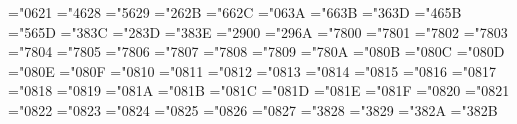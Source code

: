 \mathchardef\bfexcl="0621
\mathchardef\bflparen="4628
\mathchardef\bfrparen="5629
\mathchardef\bfplus="262B
\mathchardef\bfcomma="662C
\mathchardef\bfcolon="063A
\mathchardef\bfsemicolon="663B
\mathchardef\bfequal="363D
\mathchardef\bflbraket="465B
\mathchardef\bfrbraket="565D
\mathchardef\bflt="383C
\mathchardef\bfslash="283D
\mathchardef\bfgt="383E
\mathchardef\bfminus="2900
\mathchardef\bfvert="296A
\mathchardef\bfGamma="7800
\mathchardef\bfDelta="7801
\mathchardef\bfTheta="7802
\mathchardef\bfLambda="7803
\mathchardef\bfXi="7804
\mathchardef\bfPi="7805
\mathchardef\bfSigma="7806
\mathchardef\bfUpsilon="7807
\mathchardef\bfPhi="7808
\mathchardef\bfPsi="7809
\mathchardef\bfOmega="780A
\mathchardef\bfalpha="080B
\mathchardef\bfbeta="080C
\mathchardef\bfgamma="080D
\mathchardef\bfdelta="080E
\mathchardef\bfepsilon="080F
\mathchardef\bfzeta="0810
\mathchardef\bfeta="0811
\mathchardef\bftheta="0812
\mathchardef\bfiota="0813
\mathchardef\bfkappa="0814
\mathchardef\bflambda="0815
\mathchardef\bfmu="0816
\mathchardef\bfnu="0817
\mathchardef\bfxi="0818
\mathchardef\bfpi="0819
\mathchardef\bfrho="081A
\mathchardef\bfsigma="081B
\mathchardef\bftau="081C
\mathchardef\bfupsilon="081D
\mathchardef\bfphi="081E
\mathchardef\bfchi="081F
\mathchardef\bfpsi="0820
\mathchardef\bfomega="0821
\mathchardef\bfvarepsilon="0822
\mathchardef\bfvartheta="0823
\mathchardef\bfvarpi="0824
\mathchardef\bfvarrho="0825
\mathchardef\bfvarsigma="0826
\mathchardef\bfvarphi="0827
\mathchardef\bfleftharpoonup="3828
\mathchardef\bfleftharpoondown="3829
\mathchardef\bfrightharpoonup="382A
\mathchardef\bfrightharpoondown="382B
